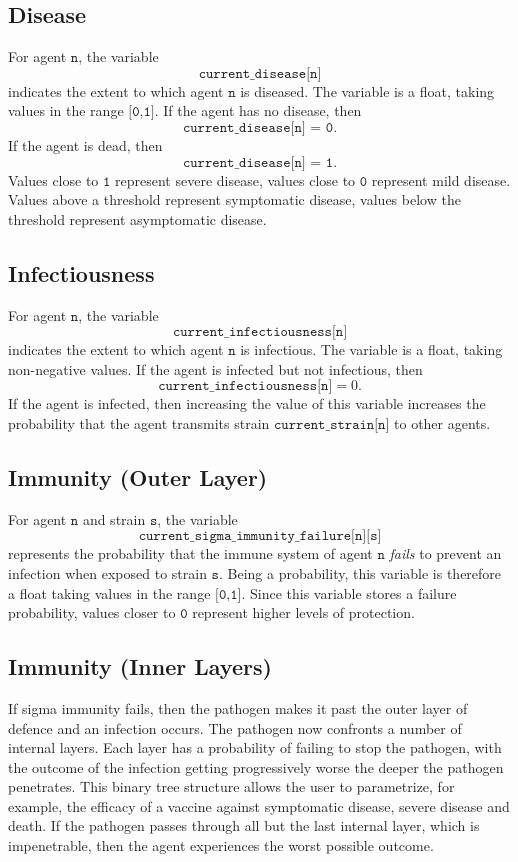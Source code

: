 \documentclass[10pt,letterpaper]{article}
\begin{document}
\subsection{Disease}

For agent $\texttt{n}$, the variable $$\texttt{current{\_}disease[n]}$$ indicates the extent to which agent $\texttt{n}$ is diseased. The variable is a float, taking values in the range $\texttt{[0,1]}.$ If the agent has no disease, then $$\texttt{current{\_}disease[n] = 0}.$$ If the agent is dead, then $$\texttt{current{\_}disease[n] = 1}.$$ Values close to $\texttt{1}$ represent severe disease, values close to $\texttt{0}$ represent mild disease. Values above a threshold represent symptomatic disease, values below the threshold represent asymptomatic disease. 

\subsection{Infectiousness}

For agent $\texttt{n}$, the variable $$\texttt{current{\_}infectiousness[n]}$$ indicates the extent to which agent $\texttt{n}$ is infectious. The variable is a float, taking non-negative values. If the agent is infected but not infectious, then $$\texttt{current{\_}infectiousness[n]} = 0.$$ If the agent is infected, then increasing the value of this variable increases the probability that the agent transmits strain $\texttt{current{\_}strain[n]}$ to other agents.

\subsection{Immunity (Outer Layer)}

For agent $\texttt{n}$ and strain $\texttt{s}$, the variable $$\texttt{current{\_}sigma{\_}immunity{\_}failure[n][s]}$$ represents the probability that the immune system of agent $\texttt{n}$ \textit{fails} to prevent an infection when exposed to strain $\texttt{s}$. Being a probability, this variable is therefore a float taking values in the range $\texttt{[0,1]}.$ Since this variable stores a failure probability, values closer to $\texttt{0}$ represent higher levels of protection.

\subsection{Immunity (Inner Layers)}

If sigma immunity fails, then the pathogen makes it past the outer layer of defence and an infection occurs. The pathogen now confronts a number of internal layers. Each layer has a probability of failing to stop the pathogen, with the outcome of the infection getting progressively worse the deeper the pathogen penetrates. This binary tree structure allows the user to parametrize, for example, the efficacy of a vaccine against symptomatic disease, severe disease and death. If the pathogen passes through all but the last internal layer, which is impenetrable, then the agent experiences the worst possible outcome.
\end{document}
